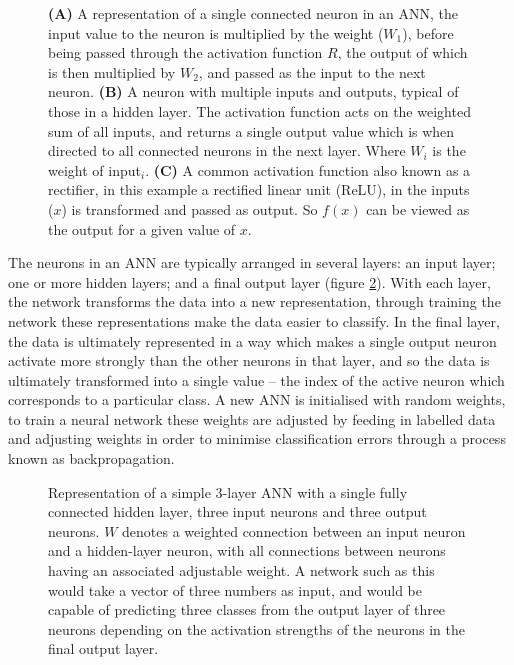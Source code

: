 \documentclass[a4paper,11pt,twoside,openright]{scrbook}
\begin{document}
\begin{figure}
    \captionsetup{width=0.9\textwidth}
    \caption[Diagram neural network neuron and activation function.]{\textbf{(A)} A representation of a single 
connected neuron in an ANN, the input value to the neuron is multiplied by the weight ($W_1$), before being passed 
through the activation function $R$, the output of which is then multiplied by $W_2$, and passed as the input to the 
next neuron. \textbf{(B)} A neuron with multiple inputs and outputs, typical of those in a hidden layer. The activation 
function acts on the weighted sum of all inputs, and returns a single output value which is when directed to all 
connected neurons in the next layer. Where $W_i$ is the weight of \textsf{input}$_i$. \textbf{(C)} A common activation 
function also known as a rectifier, in this example a rectified linear unit (ReLU), in the inputs ($x$) is transformed 
and passed as output. So $f(x)$ can be viewed as the output for a given value of $x$.}
    \label{figure:neuron_relu}

\end{figure}

The neurons in an ANN are typically arranged in several layers: an input layer; one or more hidden layers; and a final 
output layer (figure \ref{figure:nn_layers}).
With each layer, the network transforms the data into a new representation, through training the network these 
representations make the data easier to classify.
In the final layer, the data is ultimately represented in a way which makes a single output neuron activate more 
strongly than the other neurons in that layer, and so the data is ultimately transformed into a single value -- the 
index of the active neuron which corresponds to a particular class.
A new ANN is initialised with random weights, to train a neural network these weights are adjusted by feeding in 
labelled data and adjusting weights in order to minimise classification errors through a process known as 
backpropagation.\cite{Rumelhart1986}

\begin{figure}
\fcapsideright
{
    \caption[Representation of a simple ANN]{Representation of a simple 3-layer ANN with a single fully connected 
hidden layer, three input neurons and three output neurons. $W$ denotes a weighted connection between an input neuron 
and a hidden-layer neuron, with all connections between neurons having an associated adjustable weight. A network such 
as this would take a vector of three numbers as input, and would be capable of predicting three classes from the output 
layer of three neurons depending on the activation strengths of the neurons in the final output layer.}
} {
    
    \label{figure:nn_layers}
}
\end{figure}
\end{document}
